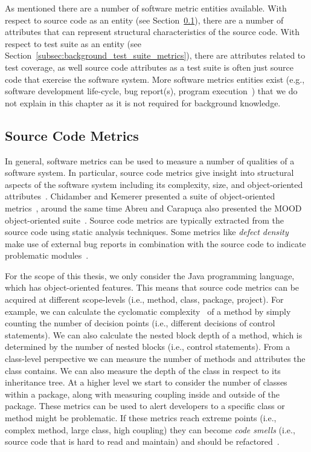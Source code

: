 As mentioned there are a number of software metric entities available. With respect to source code as an entity (see Section~\ref{subsec:background_source_code_metrics}), there are a number of attributes that can represent structural characteristics of the source code. With respect to test suite as an entity (see Section~\ref{subsec:background_test_suite_metrics}), there are attributes related to test coverage, as well source code attributes as a test suite is often just source code that exercise the software system. More software metrics entities exist (e.g., software development life-cycle, bug report(s), program execution~\cite{SS08}) that we do not explain in this chapter as it is not required for background knowledge.


\subsection{Source Code Metrics}
\label{subsec:background_source_code_metrics}
In general, software metrics can be used to measure a number of qualities of a software system. In particular, source code metrics give insight into structural aspects of the software system including its complexity, size, and object-oriented attributes~\cite{McCa76, Kan02, HWY09, Hend95, SRD12}. Chidamber and Kemerer presented a suite of object-oriented metrics~\cite{CK94}, around the same time Abreu and Carapu{\c{c}}a also presented the MOOD object-oriented suite~\cite{AC94}. Source code metrics are typically extracted from the source code using static analysis techniques. Some metrics like \emph{defect density} make use of external bug reports in combination with the source code to indicate problematic modules~\cite{FP98}. 

For the scope of this thesis, we only consider the Java programming language, which has object-oriented features. This means that source code metrics can be acquired at different scope-levels (i.e., method, class, package, project). For example, we can calculate the cyclomatic complexity~\cite{McCa76} of a method by simply counting the number of decision points (i.e., different decisions of control statements). We can also calculate the nested block depth of a method, which is determined by the number of nested blocks (i.e., control statements). From a class-level perspective we can measure the number of methods and attributes the class contains. We can also measure the depth of the class in respect to its inheritance tree. At a higher level we start to consider the number of classes within a package, along with measuring coupling inside and outside of the package. These metrics can be used to alert developers to a specific class or method might be problematic. If these metrics reach extreme points (i.e., complex method, large class, high coupling) they can become \emph{code smells} (i.e., source code that is hard to read and maintain) and should be refactored~\cite{FB99}.


